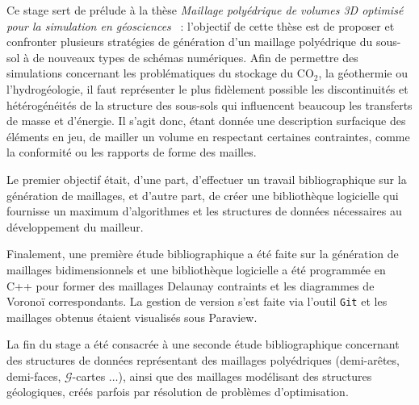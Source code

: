 \documentclass[12pt]{article}
\begin{document}
\resume

Ce stage sert de prélude à la thèse \og \emph{Maillage polyédrique de volumes 3D optimisé pour la simulation en géosciences} \fg{}~: l'objectif de cette thèse est de proposer et confronter plusieurs stratégies de génération d'un maillage polyédrique du sous-sol à de nouveaux types de schémas numériques. Afin de permettre des simulations concernant les problématiques du stockage du CO$_2$, la géothermie ou l'hydrogéologie, il faut représenter le plus fidèlement possible les discontinuités et hétérogénéités de la structure des sous-sols qui influencent beaucoup les transferts de masse et d'énergie. Il s'agit donc, étant donnée une description surfacique des éléments en jeu, de mailler un volume en respectant certaines contraintes, comme la conformité ou les rapports de forme des mailles.
\vspace{1cm}

Le premier objectif était, d'une part, d'effectuer un travail bibliographique sur la génération de maillages, et d'autre part, de créer une bibliothèque logicielle qui fournisse un maximum d'algorithmes et les structures de données nécessaires au développement du mailleur.

\vspace{1cm}

Finalement, une première étude bibliographique a été faite sur la génération de maillages bidimensionnels et une bibliothèque logicielle a été programmée en C++ pour former des maillages Delaunay contraints et les diagrammes de Voronoï correspondants. La gestion de version s'est faite via l'outil \verb+Git+ et les maillages obtenus étaient visualisés sous Paraview.

\vspace{1cm}
La fin du stage a été consacrée à une seconde étude bibliographique concernant des structures de données représentant des maillages polyédriques (demi-arêtes, demi-faces, $\mathcal{G}$-cartes $\dots$), ainsi que des maillages modélisant des structures géologiques, créés parfois par résolution de problèmes d'optimisation.
\end{document}
